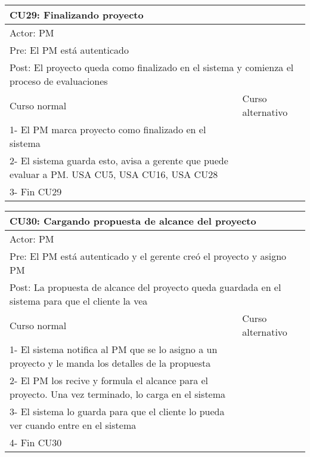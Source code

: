 \begin{table}[H]
  \begin{adjustbox}{max width = \textwidth}
  \begin{tabular}{|l|l|}
    \hline
    \multicolumn{2}{|l|}{CU29: Finalizando proyecto} \\\hline
    \multicolumn{2}{|l|}{Actor: PM} \\\hline
    \multicolumn{2}{|l|}{Pre: El PM está autenticado} \\\hline
    \multicolumn{2}{|l|}{Post: El proyecto queda como finalizado en el sistema y comienza el proceso de evaluaciones} \\\hline
     Curso normal & Curso alternativo\\ \hline
	 1- El PM marca proyecto como finalizado en el sistema & \\ \hline
	 2- El sistema guarda esto, avisa a gerente que puede evaluar a PM. USA CU5, USA CU16, USA CU28 & \\ \hline
   3- Fin CU29 & \\ \hline
  \end{tabular}
  \end{adjustbox}
\end{table}

\begin{table}[H]
  \begin{adjustbox}{max width = \textwidth}
  \begin{tabular}{|l|l|}
    \hline
    \multicolumn{2}{|l|}{CU30: Cargando propuesta de alcance del proyecto} \\\hline
    \multicolumn{2}{|l|}{Actor: PM} \\\hline
    \multicolumn{2}{|l|}{Pre: El PM está autenticado y el gerente creó el proyecto y asigno PM} \\\hline
    \multicolumn{2}{|l|}{Post: La propuesta de alcance del proyecto queda guardada en el sistema para que el cliente la vea} \\\hline
     Curso normal & Curso alternativo\\ \hline
	 1- El sistema notifica al PM que se lo asigno a un proyecto y le manda los detalles de la propuesta & \\ \hline
	 2- El PM los recive y formula el alcance para el proyecto. Una vez terminado, lo carga en el sistema& \\ \hline
   3- El sistema lo guarda para que el cliente lo pueda ver cuando entre en el sistema & \\ \hline
   4- Fin CU30 & \\ \hline
  \end{tabular}
  \end{adjustbox}
\end{table}

